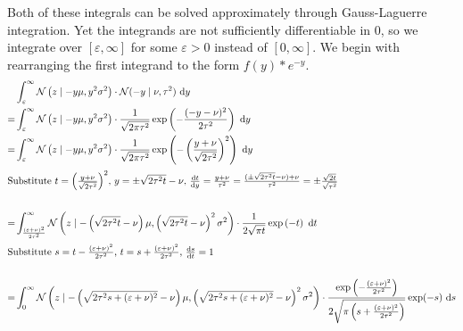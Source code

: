 \documentclass[11pt,a4paper]{book}
\begin{document}
Both of these integrals can be solved approximately through Gauss-Laguerre
integration. Yet the integrands are not sufficiently differentiable in $0$, so
we integrate over $[\varepsilon, \infty]$ for some $\varepsilon > 0$ instead of
$[0, \infty]$. We begin with rearranging the first integrand to the form
$f(y) * e^{-y}$.
\begin{align*}
  & \int_{\varepsilon}^{\infty} \mathcal{N}\left( z \mid -y\mu, y^{2}\sigma^{2} \right) \cdot \mathcal{N}(-y \mid \nu, \tau^{2})~\mathrm{d}y \\
  =& \int_{\varepsilon}^{\infty} \mathcal{N}\left( z \mid -y\mu, y^{2}\sigma^{2} \right) \cdot \frac{1}{\sqrt{2 \pi \tau^{2}}} \exp\left( -\frac{(-y - \nu)^{2}}{2\tau^{2}} \right)~\mathrm{d}y\\
  =& \int_{\varepsilon}^{\infty} \mathcal{N}\left( z \mid -y\mu, y^{2}\sigma^{2} \right) \cdot \frac{1}{\sqrt{2 \pi \tau^{2}}} \exp\left( -\left( \frac{y + \nu}{\sqrt{2\tau^{2}}} \right)^{2} \right)~\mathrm{d}y\\
  \intertext{Substitute $t = \left( \frac{y + \nu}{\sqrt{2\tau^{2}}} \right)^{2}$, $y = \pm \sqrt{2\tau^{2} t} - \nu$, $\frac{\mathrm{d}t}{\mathrm{d}y} = \frac{y + \nu}{\tau^{2}} = \frac{(\pm \sqrt{2\tau^{2} t} - \nu) + \nu}{\tau^{2}} = \pm \frac{\sqrt{2t}}{\sqrt{\tau^{2}}}$}\\
  =& \int_{\frac{(\varepsilon + \nu)^{2}}{2\tau^{2}}}^{\infty} \mathcal{N}\left( z \mid -\left( \sqrt{2\tau^{2} t} - \nu \right)\mu, \left( \sqrt{2\tau^{2} t} - \nu \right)^{2}\sigma^{2} \right) \cdot \frac{1}{2 \sqrt{\pi t}} \exp\left( -t \right)~\mathrm{d}t\\
  \intertext{Substitute $s = t - \frac{(\varepsilon + \nu)^{2}}{2\tau^{2}}$, $t = s + \frac{(\varepsilon + \nu)^{2}}{2\tau^{2}}$, $\frac{\mathrm{d}s}{\mathrm{d}t} = 1$}\\
  =& \int_{0}^{\infty} \mathcal{N}\left( z \mid -\left( \sqrt{2\tau^{2}s + (\varepsilon + \nu)^{2}} - \nu \right)\mu, \left( \sqrt{2\tau^{2}s + (\varepsilon + \nu)^{2}} - \nu \right)^{2}\sigma^{2} \right) \cdot \frac{\exp\left( -\frac{(\varepsilon + \nu)^{2}}{2\tau^{2}} \right)}{2 \sqrt{\pi \left( s + \frac{(\varepsilon + \nu)^{2}}{2\tau^{2}} \right)}} \exp(-s)~\mathrm{d}s
\end{align*}
\end{document}
